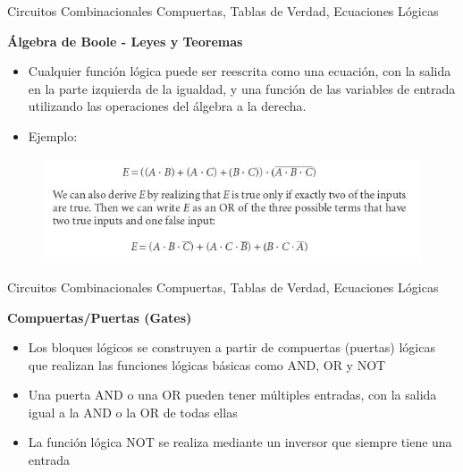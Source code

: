\documentclass[aspectratio=169,compress]{beamer}
\begin{document}
\begin{footnotesize}
\begin{frame} {Circuitos Combinacionales} {Compuertas, Tablas de Verdad, Ecuaciones Lógicas}
\begin{center}\textbf{Álgebra de Boole - Leyes y Teoremas}\end{center}
\begin{itemize}
\item Cualquier función lógica puede ser reescrita como una ecuación, 
con la salida en la parte izquierda de la igualdad, y una función 
de las variables de entrada utilizando las operaciones del álgebra a la derecha.

\item Ejemplo:
\end{itemize}
\begin{figure}
\includegraphics[scale=0.4]{images/ecuacion.jpg} 
\end{figure}
\end{frame}




\begin{frame} {Circuitos Combinacionales} {Compuertas, Tablas de Verdad, Ecuaciones Lógicas}
\begin{center}\textbf{Compuertas/Puertas (Gates)}\end{center}
\begin{itemize}
\item Los bloques lógicos se construyen a partir de 
compuertas (puertas) lógicas
 que realizan las 
funciones lógicas básicas como AND, OR y NOT
\item Una puerta AND o una OR pueden tener 
múltiples entradas, con la salida igual a la AND o 
la OR de todas ellas
\item La función lógica NOT se realiza mediante un 
inversor que siempre tiene una entrada
\end{itemize}

\end{frame}






\end{footnotesize}
\end{document}
